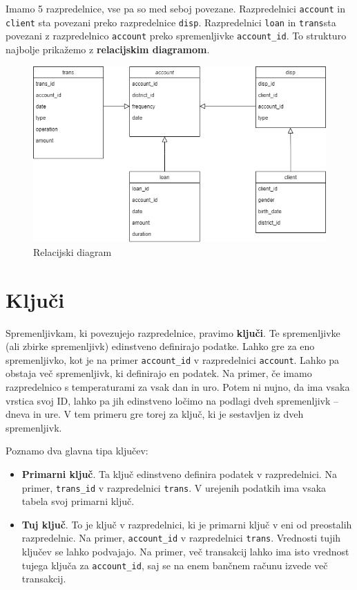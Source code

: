 \documentclass[
]{book}
\providecommand{\tightlist}{%
  \setlength{\itemsep}{0pt}\setlength{\parskip}{0pt}}
\begin{document}
Imamo 5 razpredelnice, vse pa so med seboj povezane. Razpredelnici \texttt{account} in \texttt{client} sta povezani preko razpredelnice \texttt{disp}. Razpredelnici \texttt{loan} in \texttt{trans}sta povezani z razpredelnico \texttt{account} preko spremenljivke \texttt{account\_id}. To strukturo najbolje prikažemo z \textbf{relacijskim diagramom}.

\begin{figure}
\centering
\includegraphics{./png/financial1.png}
\caption{Relacijski diagram}
\end{figure}

\hypertarget{kljuux10di}{%
\section{Ključi}\label{kljuux10di}}

Spremenljivkam, ki povezujejo razpredelnice, pravimo \textbf{ključi}. Te spremenljivke (ali zbirke spremenljivk) edinstveno definirajo podatke. Lahko gre za eno spremenljivko, kot je na primer \texttt{account\_id} v razpredelnici \texttt{account}. Lahko pa obstaja več spremenljivk, ki definirajo en podatek. Na primer, če imamo razpredelnico s temperaturami za vsak dan in uro. Potem ni nujno, da ima vsaka vrstica svoj ID, lahko pa jih edinstveno ločimo na podlagi dveh spremenljivk -- dneva in ure. V tem primeru gre torej za ključ, ki je sestavljen iz dveh spremenljivk.

Poznamo dva glavna tipa ključev:

\begin{itemize}
\tightlist
\item
  \textbf{Primarni ključ}. Ta ključ edinstveno definira podatek v razpredelnici. Na primer, \texttt{trans\_id} v razpredelnici \texttt{trans}. V urejenih podatkih ima vsaka tabela svoj primarni ključ.
\item
  \textbf{Tuj ključ}. To je ključ v razpredelnici, ki je primarni ključ v eni od preostalih razpredelnic. Na primer, \texttt{account\_id} v razpredelnici \texttt{trans}. Vrednosti tujih ključev se lahko podvajajo. Na primer, več transakcij lahko ima isto vrednost tujega ključa za \texttt{account\_id}, saj se na enem bančnem računu izvede več transakcij.
\end{itemize}
\end{document}
